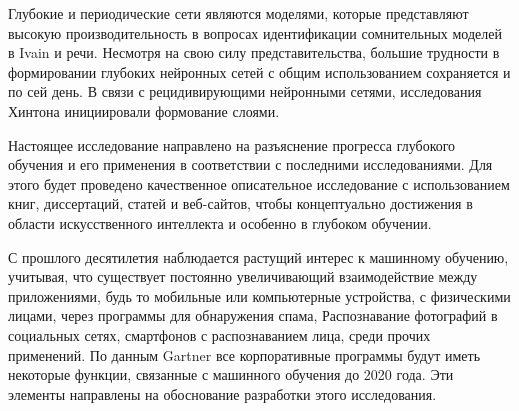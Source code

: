 Глубокие и периодические сети являются моделями, которые представляют высокую производительность
в вопросах идентификации сомнительных моделей в Ivain и речи. Несмотря на свою силу представительства,
большие трудности в формировании глубоких нейронных сетей с общим использованием сохраняется и по сей день.
В связи с рецидивирующими нейронными сетями, исследования Хинтона инициировали формование слоями.

Настоящее исследование направлено на разъяснение прогресса глубокого обучения и его применения в соответствии с последними исследованиями.
Для этого будет проведено качественное описательное исследование с использованием книг, диссертаций, статей и веб-сайтов,
чтобы концептуально достижения в области искусственного интеллекта и особенно в глубоком обучении.

С прошлого десятилетия наблюдается растущий интерес к машинному обучению, учитывая, что существует постоянно увеличивающий взаимодействие между приложениями, будь то мобильные или компьютерные устройства, с физическими лицами, через программы для обнаружения спама, Распознавание фотографий в социальных сетях, смартфонов с распознаванием лица, среди прочих применений.
По данным Gartner все корпоративные программы будут иметь некоторые функции, связанные с машинного обучения до 2020 года.
Эти элементы направлены на обоснование разработки этого исследования.